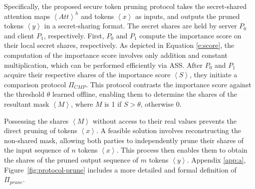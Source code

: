 Specifically, the proposed secure token pruning protocol takes the secret-shared attention maps $\left \langle Att \right \rangle^{h}$ and tokens $\left \langle x \right \rangle$ as inputs, and outputs the pruned tokens $\left \langle y \right \rangle$ in a secret-sharing format. The secret shares are held by server $P_0$ and client $P_1$, respectively. First, $P_0$ and $P_1$ compute the importance score on their local secret shares, respectively. As depicted in Equation \ref{e:score}, the computation of the importance score involves only addition and constant multiplication, which can be performed efficiently via ASS. After $P_0$ and $P_1$ acquire their respective shares of the importance score $\left \langle S \right \rangle $, they initiate a comparison protocol $\Pi_{CMP}$. This protocol contrasts the importance score against the threshold $\theta$ learned offline, enabling them to determine the shares of the resultant mask $\left \langle M \right \rangle $, where $M$ is 1 if  $S > \theta$, otherwise 0. 

Possessing the shares $\left \langle M \right \rangle$ without access to their real values prevents the direct pruning of tokens $\left \langle x \right \rangle$. A feasible solution involves reconstructing the non-shared mask, allowing both parties to independently prune their shares of the input sequence of $n$ tokens $\left \langle x \right \rangle$. This process then enables them to obtain the shares of the pruned output sequence of $m$ tokens $\left \langle y \right \rangle$. Appendix \ref{app:a}, Figure~\ref{fig:protocol-prune} includes a more detailed and formal definition of $\Pi_{prune}$.




